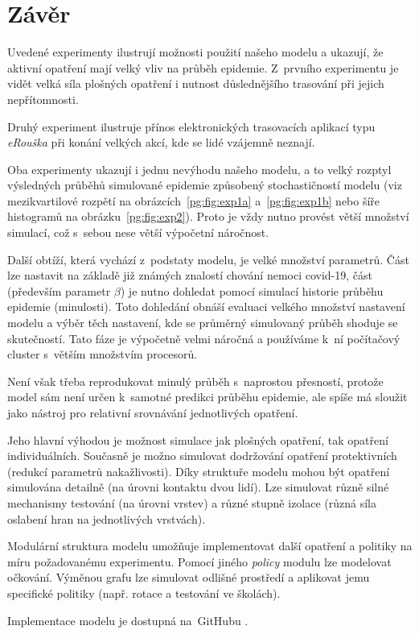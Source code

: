 \section*{Závěr}

Uvedené experimenty ilustrují možnosti použití našeho modelu a
ukazují, že aktivní opatření mají velký vliv na průběh epidemie.
Z~prvního experimentu je vidět velká síla plošných opatření i nutnost
důslednějšího trasování při jejich nepřítomnosti.

Druhý experiment ilustruje přínos elektronických trasovacích aplikací
typu {\em eRouška} při konání velkých akcí, kde se lidé vzájemně
neznají.

Oba experimenty ukazují i jednu nevýhodu našeho modelu, a to velký rozptyl 
výsledných průběhů simulované epidemie způsobený stochastičností modelu (viz mezikvartilové rozpětí na
obrázcích~\ref{pg:fig:exp1a} a~\ref{pg:fig:exp1b} nebo šíře histogramů
na obrázku~\ref{pg:fig:exp2}). Proto je vždy nutno provést větší množství
simulací, což s~sebou nese větší výpočetní náročnost.

Další obtíží, která vychází z~podstaty modelu, je velké množství parametrů. Část lze nastavit na základě
již známých znalostí chování nemoci covid-19, část (především parametr $\beta$) je nutno dohledat pomocí simulací historie průběhu epidemie (minulosti). Toto dohledání obnáší evaluaci velkého množství nastavení modelu a výběr těch nastavení, kde se průměrný simulovaný průběh shoduje se skutečností. Tato fáze je výpočetně velmi náročná a používáme k~ní počítačový cluster s~větším množstvím procesorů. 

Není však třeba reprodukovat minulý průběh s~naprostou přesností, protože model sám není určen k~samotné predikci průběhu epidemie, ale spíše má sloužit jako nástroj pro relativní srovnávání jednotlivých opatření. 

Jeho hlavní výhodou je možnost simulace jak plošných opatření, tak
opatření individuálních. Současně je možno simulovat dodržování
opatření protektivních (redukcí parametrů nakažlivosti). Díky
struktuře modelu mohou být opatření simulována detailně (na úrovni
kontaktu dvou lidí). Lze simulovat různě silné mechanismy testování
(na úrovni vrstev) a různé stupně izolace (různá síla oslabení hran
na jednotlivých vrstvách).


Modulární struktura modelu umožňuje implementovat další opatření a
politiky na míru požadovanému experimentu. Pomocí jiného {\em policy}
modulu lze modelovat očkování. Výměnou grafu lze simulovat odlišné
prostředí a aplikovat jemu specifické politiky (např. rotace a testování
ve školách).


Implementace modelu je dostupná na~GitHubu \cite{pg:mmsoft}.

